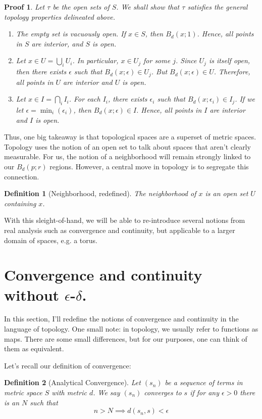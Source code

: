 \documentclass{article}
\newtheorem*{defn}{Definition}
\newtheorem*{pf}{Proof}
\begin{document}
\begin{pf}
Let $\tau$ be the open sets of $S$. We shall show that $\tau$ satisfies the
general topology properties delineated above.

\begin{enumerate}
\item The empty set is vacuously open. If $x \in S$, then $B_d(x; 1)$. Hence,
all points in $S$ are interior, and $S$ is open.
\item Let $x \in U = \bigcup_i U_i$. In particular, $x \in U_j$ for some $j$. Since
$U_j$ is itself open, then there exists $\epsilon$ such that $B_d(x; \epsilon)
\in U_j$. But $B_d(x; \epsilon) \in U$. Therefore, all points in $U$ are
interior and $U$ is open.
\item Let $x \in I = \bigcap_i I_i$. For each $I_i$, there exists $\epsilon_i$
such that $B_d(x; \epsilon_i) \in I_j$. If we let $\epsilon =
\min_i(\epsilon_i)$, then $B_d(x; \epsilon) \in I$. Hence, all points in $I$
are interior and $I$ is open.
\end{enumerate}
\end{pf}

Thus, one big takeaway is that topological spaces are a superset of metric
spaces. Topology uses the notion of an open set to talk about spaces that aren't
clearly measurable. For us, the notion of a neighborhood will remain strongly
linked to our $B_d(p;r)$ regions. However, a central move in topology is to
segregate this connection.

\begin{defn}[Neighborhood, redefined]
    The neighborhood of $x$ is an open set $U$ containing $x$.
\end{defn}

With this sleight-of-hand, we will be able to re-introduce several notions from
real analysis such as convergence and continuity, but applicable to a larger
domain of spaces, e.g. a torus.

\section{Convergence and continuity without $\epsilon$-$\delta$.}

In this section, I'll redefine the notions of convergence and continuity in the
language of topology. One small note: in topology, we usually refer to
functions as maps. There are some small differences, but for our purposes, one
can think of them as equivalent.

Let's recall our definition of convergence:
\begin{defn}[Analytical Convergence]
    Let $(s_n)$ be a sequence of terms in metric space $S$ with metric $d$. We
    say $(s_n)$ converges to $s$ if for any $\epsilon > 0$ there is an
    $N$ such that $$n>N \implies d(s_n, s) < \epsilon$$
\end{defn}
\end{document}
